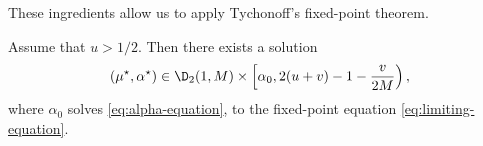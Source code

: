These ingredients allow us to apply Tychonoff's fixed-point theorem.

\begin{theorem}
  \label{thm:existence-fixed-point}
  Assume that $u > 1/2$. Then there exists a solution
  $$(\mu^\star, \alpha^\star)\in \D_2(1, M)\times\left[\alpha_0, 2(u+v)-1-\dfrac{v}{2M}\right),$$
  where $\alpha_0$ solves \eqref{eq:alpha-equation}, to the fixed-point equation \eqref{eq:limiting-equation}.
\end{theorem}










